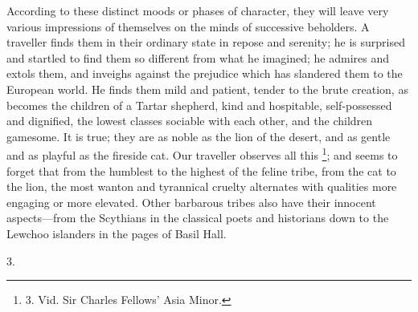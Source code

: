 According to these distinct
moods or phases of character, they will leave very various impressions
of themselves on the minds of successive beholders. A traveller finds
them in their ordinary state in repose and serenity; he is surprised
and startled to find them so different from what he imagined; he
admires and extols them, and inveighs against the prejudice which has
slandered them to the European world. He finds them mild and patient,
tender to the brute creation, as becomes the children of a Tartar
shepherd, kind and hospitable, self-possessed and dignified, the
lowest classes sociable with each other, and the children gamesome. It
is true; they are as noble as the lion of the desert, and as gentle
and as playful as the fireside cat. Our traveller observes all this \footnote{3.
Vid. Sir Charles Fellows' Asia Minor.}; and seems to forget
that from the humblest to the highest of the feline tribe, from the
cat to the lion, the most wanton and tyrannical cruelty alternates
with qualities more engaging or more elevated. Other barbarous tribes
also have their innocent aspects—from the Scythians in the classical
poets and historians down to the Lewchoo islanders in the pages of
Basil Hall.

3.

